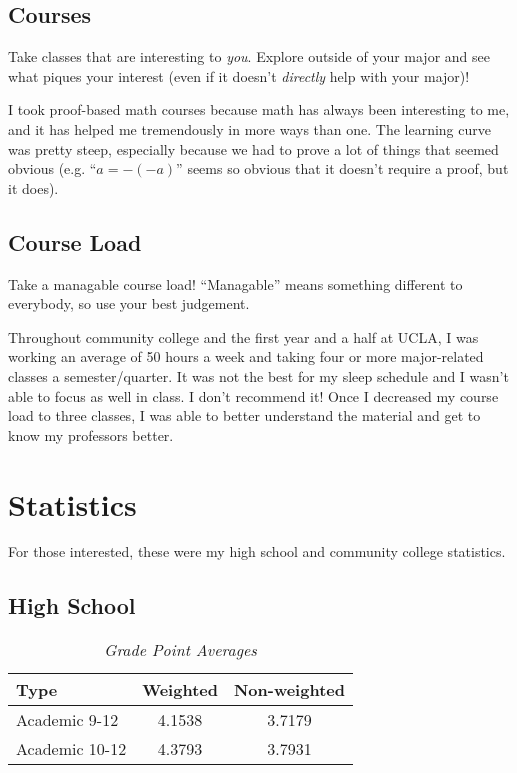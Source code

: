 \documentclass[12pt]{article}
\newenvironment{example}{
\begin{tcolorbox}[title=Example, colback=blue!5!white, colframe=black!75!blue]
}{ \end{tcolorbox} }
\renewcommand{\it}[1]{\textit{{#1}}}
\begin{document}
\subsection{Courses}
Take classes that are interesting to \it{you}. Explore outside of your major and
see what piques your interest (even if it doesn't \it{directly} help with your
major)!
\begin{example}
    I took proof-based math courses because math has always been interesting
    to me, and it has helped me tremendously in more ways than one. The
    learning curve was pretty steep, especially because we had to prove a lot of
    things that seemed obvious (e.g. ``$a = -(-a)$'' seems so obvious that
    it doesn't require a proof, but it does).
\end{example}

\subsection{Course Load}
Take a managable course load! ``Managable'' means something different to
everybody, so use your best judgement.
\begin{example}
    Throughout community college and the first year and a half at UCLA, I was
    working an average of 50 hours a week and taking four or more major-related
    classes a semester/quarter. It was not the best for my sleep schedule and I
    wasn't able to focus as well in class. I don't recommend it! Once I
    decreased my course load to three classes, I was able to better understand
    the material and get to know my professors better.
\end{example}


\newpage
\section{Statistics}
For those interested, these were my high school and community college
statistics.
\subsection{High School}
\begin{table}[ht]
    \centering
    \caption*{\it{Grade Point Averages}}
    \vspace{-0.8em}
    \begin{tabular}{l|c|c}
        Type           & Weighted & Non-weighted \\
        \hline
        Academic 9-12  & 4.1538   & 3.7179 \\
        Academic 10-12 & 4.3793   & 3.7931 \\
    \end{tabular}
    \vspace{-1em}
\end{table}
\end{document}
